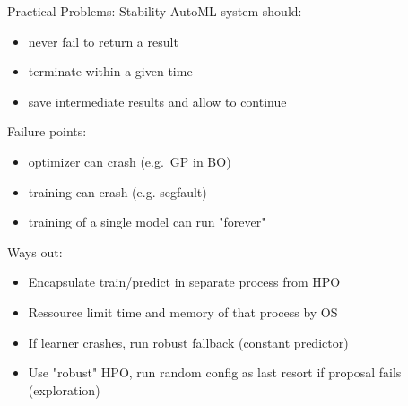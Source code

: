 

\usepackage[normalem]{ulem}
\usepackage{pifont}
\usepackage{relsize}
\renewcommand{\lit}[1]{{\smaller\color{black!60}[#1]}}
\subtitle{Practical Problems}



	
	\maketitle
	
	\begin{frame}{Practical Problems: Stability}
		AutoML system should: 
		\begin{itemize}
			\item never fail to return a result
			\item terminate within a given time
			\item save intermediate results and allow to continue
		\end{itemize}
		
		\pause
		Failure points:
		\begin{itemize}
			\item optimizer can crash (e.g.\ GP in BO) 
			\item training can crash (e.g. segfault) 
			\item training of a single model can run "forever" 
		\end{itemize}
		
		\pause
		Ways out:
		\begin{itemize}
			\item Encapsulate train/predict in separate process from HPO
			\item Ressource limit time and memory of that process by OS
			\item If learner crashes, run robust fallback (constant predictor)   
			\item Use "robust" HPO, run random config as last resort if proposal fails (exploration)
		\end{itemize}
		
	\end{frame}
	
